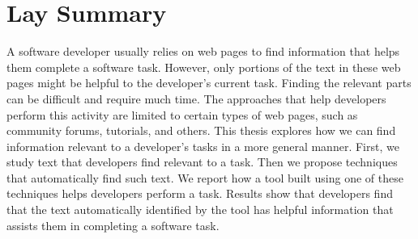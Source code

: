 

\chapter*{Lay Summary}

A software developer usually relies on web pages to find information that helps them complete a software task. 
However, only portions of the text in these web pages might be helpful to the developer's current task.
Finding the relevant parts can be difficult and require much time. The approaches that help developers perform this activity are limited to certain types of web pages, such as community forums, tutorials, and others. 
This thesis explores how we can find information relevant to a developer's tasks in a more general manner. 
First, we study text that developers find relevant to a task. 
Then we propose techniques that automatically find such text. 
We report how a tool built using one of these techniques helps developers perform a task. 
Results show that developers find that the text automatically identified by the tool has helpful information that assists them in completing a software task.
